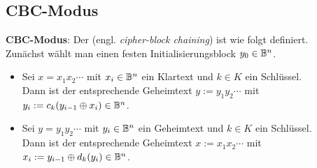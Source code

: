 \pagebreak

\subsection{%
    CBC-Modus%
}

\textbf{CBC-Modus}:
Der  (engl. \emph{cipher-block chaining}) ist wie folgt definiert.\\
Zunächst wählt man einen festen Initialisierungsblock $y_0 \in \mathbb{B}^n$.
\begin{itemize}
    \item
    Sei $x = x_1 x_2 \cdots$ mit $x_i \in \mathbb{B}^n$ ein Klartext und $k \in K$ ein Schlüssel.\\
    Dann ist der entsprechende Geheimtext $y := y_1 y_2 \cdots$ mit
    $y_i := c_k(y_{i-1} \oplus x_i) \in \mathbb{B}^n$.

    \item
    Sei $y = y_1 y_2 \cdots$ mit $y_i \in \mathbb{B}^n$ ein Geheimtext und $k \in K$ ein Schlüssel.\\
    Dann ist der entsprechende Geheimtext $x := x_1 x_2 \cdots$ mit
    $x_i := y_{i-1} \oplus d_k(y_i) \in \mathbb{B}^n$.
\end{itemize}
\displaymathother
